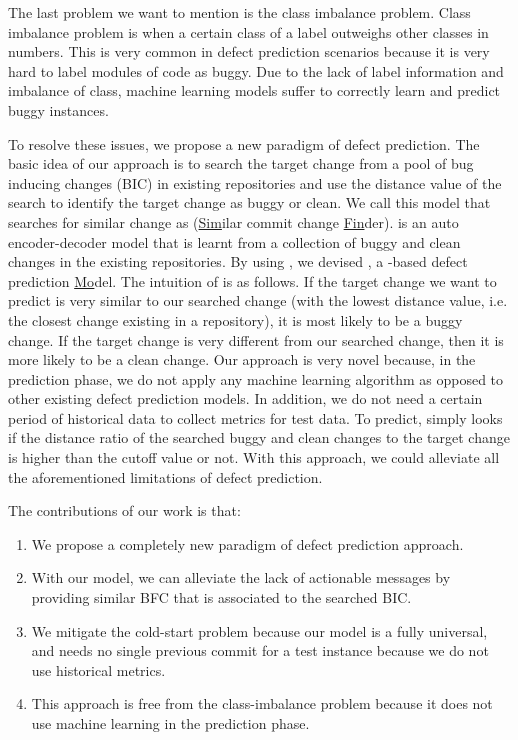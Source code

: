 The last problem we want to mention is the class imbalance problem.
Class imbalance problem is when a certain class of a label outweighs other classes in numbers.
This is very common in defect prediction scenarios because it is very hard to label modules of code as buggy.
Due to the lack of label information and imbalance of class, machine learning models suffer to correctly learn and predict buggy instances.

To resolve these issues, we propose a new paradigm of defect prediction.
The basic idea of our approach is to search the target change from a pool of bug inducing changes (BIC) in existing repositories and use the distance value of the search to identify the target change as buggy or clean.
We call this model that searches for similar change as {\simfin} (\underline{Sim}ilar commit change \underline{Fin}der).
{\simfin} is an auto encoder-decoder model that is learnt from a collection of buggy and clean changes in the existing repositories. By using {\simfin}, we devised {\simfinmo}, a \underline{\simfin}-based defect prediction \underline{Mo}del. The intuition of {\simfin} is as follows.
If the target change we want to predict is very similar to our searched change (with the lowest distance value, i.e. the closest change existing in a repository), it is most likely to be a buggy change.
If the target change is very different from our searched change, then it is more likely to be a clean change. 
Our approach is very novel because, in the prediction phase, we do not apply any machine learning algorithm as opposed to other existing defect prediction models. In addition, we do not need a certain period of historical data to collect metrics for test data.
To predict, {\simfinmo} simply looks if the distance ratio of the searched buggy and clean changes to the target change is higher than the cutoff value or not.
With this approach, we could alleviate all the aforementioned limitations of defect prediction.

\vspace{3mm}
The contributions of our work is that:
\begin{enumerate}
    \item We propose a completely new paradigm of defect prediction approach.
    \item With our model, we can alleviate the lack of actionable messages by providing similar BFC that is associated to the searched BIC.
    \item We mitigate the cold-start problem because our model is a fully universal, and needs no single previous commit for a test instance because we do not use historical metrics.
    \item This approach is free from the class-imbalance problem because it does not use machine learning in the prediction phase.
\end{enumerate}


